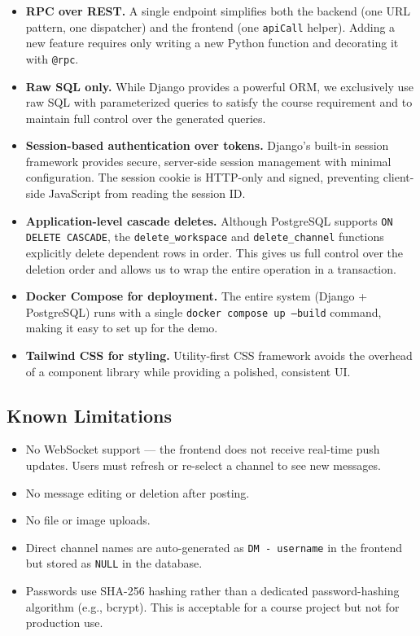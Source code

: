 \documentclass[11pt]{article}
\begin{document}
\begin{itemize}
    \item \textbf{RPC over REST.} A single endpoint simplifies both the backend (one URL pattern, one dispatcher) and the frontend (one \texttt{apiCall} helper). Adding a new feature requires only writing a new Python function and decorating it with \texttt{@rpc}.

    \item \textbf{Raw SQL only.} While Django provides a powerful ORM, we exclusively use raw SQL with parameterized queries to satisfy the course requirement and to maintain full control over the generated queries.

    \item \textbf{Session-based authentication over tokens.} Django's built-in session framework provides secure, server-side session management with minimal configuration. The session cookie is HTTP-only and signed, preventing client-side JavaScript from reading the session ID.

    \item \textbf{Application-level cascade deletes.} Although PostgreSQL supports \texttt{ON DELETE CASCADE}, the \texttt{delete\_workspace} and \texttt{delete\_channel} functions explicitly delete dependent rows in order. This gives us full control over the deletion order and allows us to wrap the entire operation in a transaction.

    \item \textbf{Docker Compose for deployment.} The entire system (Django + PostgreSQL) runs with a single \texttt{docker compose up --build} command, making it easy to set up for the demo.

    \item \textbf{Tailwind CSS for styling.} Utility-first CSS framework avoids the overhead of a component library while providing a polished, consistent UI.
\end{itemize}

\subsection{Known Limitations}

\begin{itemize}
    \item No WebSocket support --- the frontend does not receive real-time push updates. Users must refresh or re-select a channel to see new messages.
    \item No message editing or deletion after posting.
    \item No file or image uploads.
    \item Direct channel names are auto-generated as \texttt{DM - username} in the frontend but stored as \texttt{NULL} in the database.
    \item Passwords use SHA-256 hashing rather than a dedicated password-hashing algorithm (e.g., bcrypt). This is acceptable for a course project but not for production use.
\end{itemize}
\end{document}
